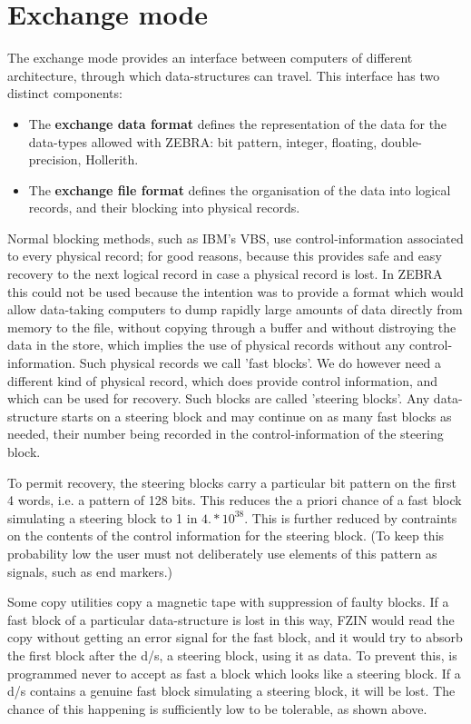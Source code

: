 \section{Exchange mode}

The exchange mode provides an interface between computers of
different architecture, through which data-structures can travel.
This interface has two distinct components:

\begin{itemize}
 \item The {\bf exchange data format} defines the representation
       of the data for the data-types allowed with ZEBRA:
       bit pattern, integer, floating, double-precision, Hollerith.
 \item The {\bf exchange file format} defines the organisation of
       the data into logical records,
       and their blocking into physical records.
\end{itemize}

Normal blocking methods, such as IBM's VBS,
use control-information associated to every physical record;
for good reasons, because this provides safe and easy recovery to the
next logical record in case a physical record is lost.
In ZEBRA this could not be used because the intention was to provide
a format which would allow data-taking computers to dump rapidly
large amounts of data directly from memory to the file,
without copying through a buffer and without distroying the data
in the store,
which implies the use of physical records without
any control-information.
Such physical records we call 'fast blocks'.
We do however need a different kind of physical record,
which does provide control information,
and which can be used for recovery.
Such blocks are called 'steering blocks'.
Any data-structure starts on a steering block and may continue on as
many fast blocks as needed,
their number being recorded in the control-information of the
steering block.

To permit recovery, the steering blocks carry a particular bit
pattern on the first 4 words,
i.e. a pattern of 128 bits.
This reduces the a priori chance of a fast block
simulating a steering block to 1 in \(4.*10^{38}\).
This is further reduced by contraints on the contents of the control
information for the steering block.
(To keep this probability low the user must not deliberately
use elements of this pattern as signals,
such as end markers.)

Some copy utilities copy a magnetic tape with suppression of faulty
blocks.
If a fast block of a particular data-structure is lost in this way,
FZIN would read the copy without getting an error signal
for the fast block,
and it would try to absorb the first block after the d/s,
a steering block, using it as data.
To prevent this,  is programmed never to accept as fast
a block which looks like a steering block.
If a d/s contains a genuine fast block simulating a steering block,
it will be lost.
The chance of this happening is sufficiently low to be tolerable,
as shown above.

